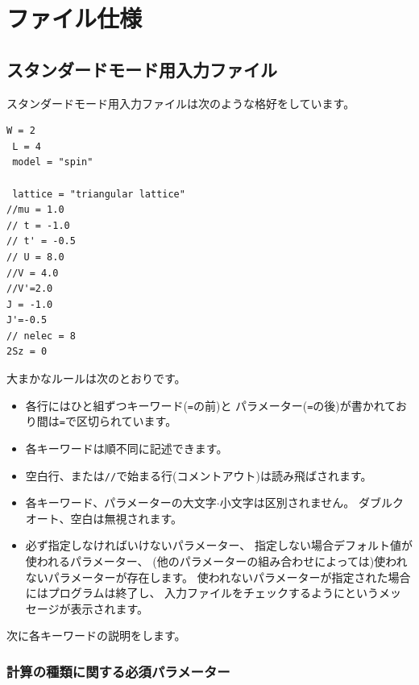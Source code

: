\chapter{ファイル仕様}

\section{スタンダードモード用入力ファイル}
\label{Ch:HowToStandard}

スタンダードモード用入力ファイルは次のような格好をしています。

\begin{minipage}{10cm}
\begin{screen}
\begin{verbatim}
W = 2
 L = 4
 model = "spin"

 lattice = "triangular lattice"
//mu = 1.0
// t = -1.0
// t' = -0.5
// U = 8.0
//V = 4.0
//V'=2.0
J = -1.0
J'=-0.5
// nelec = 8
2Sz = 0
\end{verbatim}
\end{screen}
\end{minipage}

大まかなルールは次のとおりです。
\begin{itemize}
\item 各行にはひと組ずつキーワード(\verb|=|の前)と
  パラメーター(\verb|=|の後)が書かれており間は\verb|=|で区切られています。
\item 各キーワードは順不同に記述できます。
\item 空白行、または\verb|//|で始まる行(コメントアウト)は読み飛ばされます。
\item 各キーワード、パラメーターの大文字$\cdot$小文字は区別されません。
  ダブルクオート、空白は無視されます。
\item 必ず指定しなければいけないパラメーター、
  指定しない場合デフォルト値が使われるパラメーター、
  (他のパラメーターの組み合わせによっては)使われないパラメーターが存在します。
  使われないパラメーターが指定された場合にはプログラムは終了し、
  入力ファイルをチェックするようにというメッセージが表示されます。
\end{itemize}

次に各キーワードの説明をします。

\subsection{計算の種類に関する必須パラメーター}

